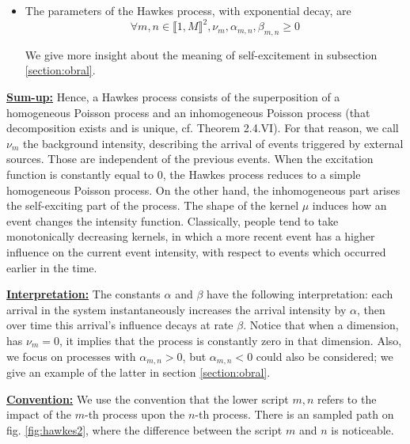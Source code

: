 \documentclass[11pt]{book}
\begin{document}
\begin{definition}
\begin{itemize}
\item The parameters of the Hawkes process, with exponential decay, are $$ \forall m,n \in \llbracket 1, M \rrbracket^2, \nu_m, \alpha_{m,n}, \beta_{m,n} \geq 0$$


We give more insight about the meaning of self-excitement in subsection \ref{section:obral}.
\end{itemize}
\end{definition}

\underline{\textbf{Sum-up:}} Hence, a Hawkes process consists of the superposition of a homogeneous Poisson process and an inhomogeneous Poisson process (that decomposition exists and is unique, cf. \cite{daley} Theorem 2.4.VI). For that reason, we call $\nu_m$ the background intensity, describing the arrival of events triggered by external sources. Those are independent of the previous events. When the excitation function is constantly equal to $0$, the Hawkes process reduces to a simple homogeneous Poisson process. On the other hand, the inhomogeneous part arises the self-exciting part of the process. The shape of the kernel $\mu$ induces how an event changes the intensity function. Classically, people tend to take monotonically decreasing kernels, in which a more recent event has a higher influence on the current event intensity, with respect to events which occurred earlier in the time.

\vspace{0.5cm}

\underline{\textbf{Interpretation:}} The constants $\alpha$ and $\beta$ have the following interpretation: each arrival in the system instantaneously increases the arrival intensity by $\alpha$, then over time this arrival's influence decays at rate $\beta$.
Notice that when a dimension, has $\nu_m = 0$, it implies that the process is constantly zero in that dimension. Also, we focus on processes with $\alpha_{m,n} > 0$, but $\alpha_{m,n} < 0$ could also be considered; we give an example of the latter in section \ref{section:obral}. 

\vspace{0.5cm}

\underline{\textbf{Convention:}} We use the convention that the lower script $m,n$ refers to the impact of the $m$-th process upon the $n$-th process. There is an sampled path on fig. \ref{fig:hawkes2}, where the difference between the script $m$ and $n$ is noticeable.

\vspace{0.5cm}
\end{document}
